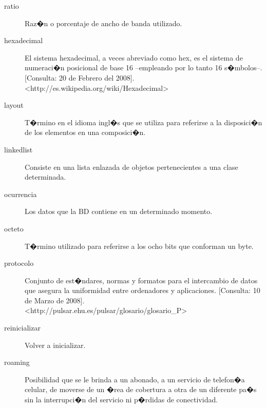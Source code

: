 \begin{description}


	\item[ratio] Raz�n o porcentaje de ancho de banda utilizado.

	\item[hexadecimal] El sistema hexadecimal, a veces abreviado como hex, es el sistema de numeraci�n posicional de base 16 --empleando por lo tanto 16 s�mbolos--. [Consulta: 20 de Febrero del 2008].\\
	<http://es.wikipedia.org/wiki/Hexadecimal>

  \item[layout] T�rmino en el idioma ingl�s que se utiliza para referirse a la disposici�n de los elementos en una composici�n.
   
	\item[linkedlist] Consiste en una lista enlazada de objetos pertenecientes a una clase determinada.
	
	\item[ocurrencia] Los datos que la \ac{BD} contiene en un determinado momento.
	
	\item[octeto] T�rmino utilizado para referirse a los ocho bits que conforman un byte.
	
	\item[protocolo] Conjunto de est�ndares, normas y formatos para el intercambio de datos que asegura la uniformidad entre ordenadores y aplicaciones. [Consulta: 10 de Marzo de 2008].\\ <http://pulsar.ehu.es/pulsar/glosario/glosario\_P>

	\item[reinicializar] Volver a inicializar.



	\item[roaming] Posibilidad que se le brinda a un abonado, a un servicio de telefon�a celular, de moverse de un �rea de cobertura a otra de un diferente pa�s sin la interrupci�n del servicio ni p�rdidas de conectividad.


\end{description}
